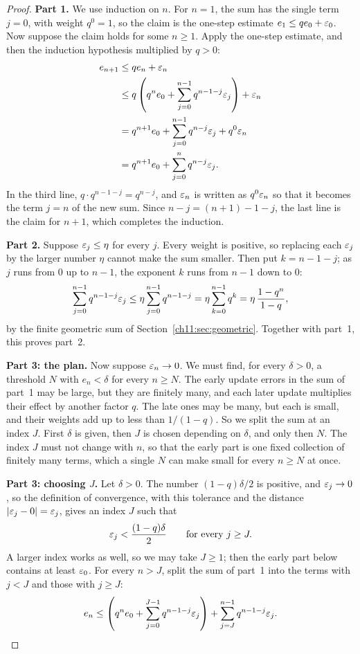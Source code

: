 \begin{proof}
\textbf{Part 1.} We use induction on $n$. For $n=1$, the sum has the single term $j=0$, with weight $q^0=1$, so the claim is the one-step estimate $e_1\le qe_0+\varepsilon_0$. Now suppose the claim holds for some $n\ge1$. Apply the one-step estimate, and then the induction hypothesis multiplied by $q>0$:
\begin{align*}
 e_{n+1}
 &\le qe_n+\varepsilon_n\\
 &\le q\left(q^n e_0+\sum_{j=0}^{n-1}q^{n-1-j}\varepsilon_j\right)+\varepsilon_n\\
 &=q^{n+1}e_0+\sum_{j=0}^{n-1}q^{n-j}\varepsilon_j+q^0\varepsilon_n\\
 &=q^{n+1}e_0+\sum_{j=0}^{n}q^{n-j}\varepsilon_j.
\end{align*}
In the third line, $q\cdot q^{n-1-j}=q^{n-j}$, and $\varepsilon_n$ is written as $q^0\varepsilon_n$ so that it becomes the term $j=n$ of the new sum. Since $n-j=(n+1)-1-j$, the last line is the claim for $n+1$, which completes the induction.

\textbf{Part 2.} Suppose $\varepsilon_j\le\eta$ for every $j$. Every weight is positive, so replacing each $\varepsilon_j$ by the larger number $\eta$ cannot make the sum smaller. Then put $k=n-1-j$; as $j$ runs from $0$ up to $n-1$, the exponent $k$ runs from $n-1$ down to $0$:
\[
 \sum_{j=0}^{n-1}q^{n-1-j}\varepsilon_j
 \le\eta\sum_{j=0}^{n-1}q^{n-1-j}
 =\eta\sum_{k=0}^{n-1}q^k
 =\eta\,\frac{1-q^n}{1-q},
\]
by the finite geometric sum of Section~\ref{ch11:sec:geometric}. Together with part~1, this proves part~2.

\textbf{Part 3: the plan.} Now suppose $\varepsilon_n\to0$. We must find, for every $\delta>0$, a threshold $N$ with $e_n<\delta$ for every $n\ge N$. The early update errors in the sum of part~1 may be large, but they are finitely many, and each later update multiplies their effect by another factor $q$. The late ones may be many, but each is small, and their weights add up to less than $1/(1-q)$. So we split the sum at an index $J$. First $\delta$ is given, then $J$ is chosen depending on $\delta$, and only then $N$. The index $J$ must not change with $n$, so that the early part is one fixed collection of finitely many terms, which a single $N$ can make small for every $n\ge N$ at once.

\textbf{Part 3: choosing $J$.} Let $\delta>0$. The number $(1-q)\delta/2$ is positive, and $\varepsilon_j\to0$, so the definition of convergence, with this tolerance and the distance $|\varepsilon_j-0|=\varepsilon_j$, gives an index $J$ such that
\[
 \varepsilon_j<\frac{(1-q)\delta}{2}\qquad\text{for every }j\ge J.
\]
A larger index works as well, so we may take $J\ge1$; then the early part below contains at least $\varepsilon_0$. For every $n>J$, split the sum of part~1 into the terms with $j<J$ and those with $j\ge J$:
\[
 e_n\le\left(q^ne_0+\sum_{j=0}^{J-1}q^{n-1-j}\varepsilon_j\right)+\sum_{j=J}^{n-1}q^{n-1-j}\varepsilon_j.
\]


\end{proof}
